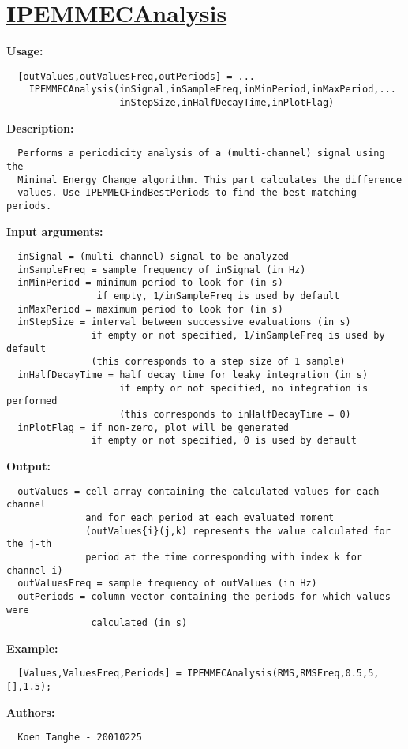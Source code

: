 \newpage
\section*{\hyperlink{Concepts:IPEMMECAnalysis}{IPEMMECAnalysis}}
\hypertarget{FuncRef:IPEMMECAnalysis}{}

\textbf{Usage:}
\begin{verbatim}  [outValues,outValuesFreq,outPeriods] = ...
    IPEMMECAnalysis(inSignal,inSampleFreq,inMinPeriod,inMaxPeriod,...
                    inStepSize,inHalfDecayTime,inPlotFlag)

\end{verbatim}
\textbf{Description:}
\begin{verbatim}  Performs a periodicity analysis of a (multi-channel) signal using the
  Minimal Energy Change algorithm. This part calculates the difference
  values. Use IPEMMECFindBestPeriods to find the best matching periods.

\end{verbatim}
\textbf{Input arguments:}
\begin{verbatim}  inSignal = (multi-channel) signal to be analyzed
  inSampleFreq = sample frequency of inSignal (in Hz)
  inMinPeriod = minimum period to look for (in s)
                if empty, 1/inSampleFreq is used by default
  inMaxPeriod = maximum period to look for (in s)
  inStepSize = interval between successive evaluations (in s)
               if empty or not specified, 1/inSampleFreq is used by default
               (this corresponds to a step size of 1 sample)
  inHalfDecayTime = half decay time for leaky integration (in s)
                    if empty or not specified, no integration is performed
                    (this corresponds to inHalfDecayTime = 0)
  inPlotFlag = if non-zero, plot will be generated
               if empty or not specified, 0 is used by default

\end{verbatim}
\textbf{Output:}
\begin{verbatim}  outValues = cell array containing the calculated values for each channel
              and for each period at each evaluated moment
              (outValues{i}(j,k) represents the value calculated for the j-th
              period at the time corresponding with index k for channel i)
  outValuesFreq = sample frequency of outValues (in Hz)
  outPeriods = column vector containing the periods for which values were
               calculated (in s)

\end{verbatim}
\textbf{Example:}
\begin{verbatim}  [Values,ValuesFreq,Periods] = IPEMMECAnalysis(RMS,RMSFreq,0.5,5,[],1.5);

\end{verbatim}
\textbf{Authors:}
\begin{verbatim}  Koen Tanghe - 20010225
\end{verbatim}



